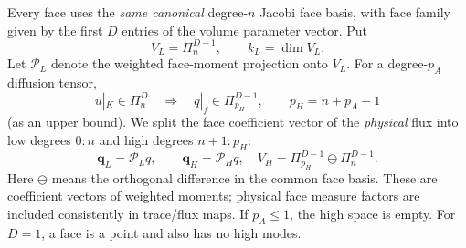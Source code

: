 \documentclass[11pt,letterpaper]{article}
\newcommand{\PP}{\mathcal P}
\newcommand{\qlow}{\mathbf q_L}
\newcommand{\qhigh}{\mathbf q_H}
\begin{document}
Every face uses the \emph{same canonical} degree-\(n\) Jacobi face basis, with face family given by the first \(D\) entries of the volume parameter vector. Put
\begin{equation}
 V_L=\Pi_n^{D-1},\qquad k_L=\dim V_L.
\end{equation}
Let \(\PP_L\) denote the weighted face-moment projection onto \(V_L\). For a degree-\(p_A\) diffusion tensor,
\begin{equation}\label{eq:qdegree}
 u|_K\in\Pi_n^D\quad\Longrightarrow\quad
 q|_f\in\Pi_{p_H}^{D-1},\qquad p_H=n+p_A-1
\end{equation}
(as an upper bound). We split the face coefficient vector of the \emph{physical} flux into low degrees \(0{:}n\) and high degrees \(n+1{:}p_H\):
\begin{equation}\label{eq:split}
 \qlow=\PP_L q,\qquad
 \qhigh=\PP_H q,\quad
 V_H=\Pi_{p_H}^{D-1}\ominus\Pi_n^{D-1}.
\end{equation}
Here \(\ominus\) means the orthogonal difference in the common face basis. These are coefficient vectors of weighted moments; physical face measure factors are included consistently in trace/flux maps. If \(p_A\le1\), the high space is empty. For \(D=1\), a face is a point and also has no high modes.
\end{document}

